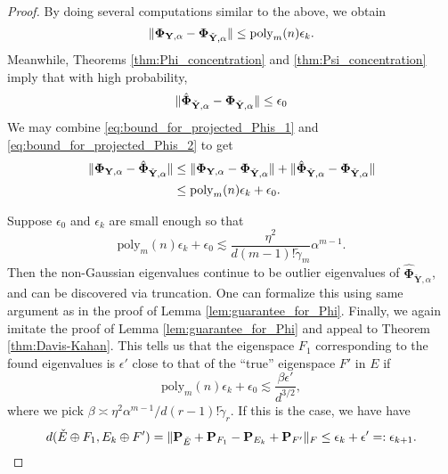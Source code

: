 \documentclass[final,12pt]{colt2018} %
\numberwithin{equation}{section}
\DeclarePairedDelimiter{\norm}{\lVert}{\rVert}
\newcommand{\boldPhi}{\boldsymbol{\Phi}}
\newcommand{\boldP}{\textbf{P}}
\newcommand{\boldY}{\textbf{Y}}
\begin{document}
\begin{proof}
	By doing several computations similar to the above, we obtain
	\begin{equation} \label{eq:bound_for_projected_Phis_1}
	\norm{\boldPhi_{\boldY,\alpha} - \boldPhi_{\check{\boldY},\alpha}} \leq \text{poly}_m(n)\epsilon_k.
	\end{equation}
	Meanwhile, Theorems \ref{thm:Phi_concentration} and \ref{thm:Psi_concentration} imply that with high probability,
	\begin{equation} \label{eq:bound_for_projected_Phis_2}
	\norm{\hat{\boldPhi}_{\check{\boldY},\alpha} - \boldPhi_{\check{\boldY},\alpha}} \leq \epsilon_0
	\end{equation}
	We may combine \eqref{eq:bound_for_projected_Phis_1} and \eqref{eq:bound_for_projected_Phis_2} to get
	\begin{align*}
	\norm{\boldPhi_{\boldY,\alpha} - \hat{\boldPhi}_{\check{\boldY},\alpha}} & \leq \norm{\boldPhi_{\boldY,\alpha} - \boldPhi_{\check{\boldY},\alpha}} + \norm{\hat{\boldPhi}_{\check{\boldY},\alpha} - \boldPhi_{\check{\boldY},\alpha}} \\
	& \leq \text{poly}_m(n)\epsilon_k+ \epsilon_0.
	\end{align*}
	
	Suppose $\epsilon_0$ and $\epsilon_k$ are small enough so that
	\begin{equation} \label{eq:first_req_for_eps}
	\text{poly}_m(n)\epsilon_k + \epsilon_0 \lesssim \frac{\eta^2}{d(m-1)!\tilde{\gamma}_m}\alpha^{m-1}.
	\end{equation}
	Then the non-Gaussian eigenvalues continue to be outlier eigenvalues of $\hat{\boldPhi}_{\check{\boldY},\alpha}$, and can be discovered via truncation. One can formalize this using same argument as in the proof of Lemma \ref{lem:guarantee_for_Phi}. Finally, we again imitate the proof of Lemma \ref{lem:guarantee_for_Phi} and appeal to Theorem \ref{thm:Davis-Kahan}. This tells us that the eigenspace $F_1$ corresponding to the found eigenvalues is $\epsilon'$ close to that of the ``true'' eigenspace $F'$ in $E$ if
	\begin{equation} \label{eq:second_req_for_eps}
	\text{poly}_m(n)\epsilon_k + \epsilon_0 \lesssim \frac{\beta\epsilon'}{d^{3/2}},
	\end{equation}
	where we pick $\beta \asymp \eta^2\alpha^{m-1}/d(r-1)!\tilde{\gamma}_r$. If this is the case, we have have
	\begin{equation*}
	d(\check{E}\oplus F_1,E_k\oplus F') = \norm{\boldP_{\check{E}}+\boldP_{F_1} - \boldP_{E_k}+\boldP_{F'}}_F \leq \epsilon_k + \epsilon' =: \epsilon_{k+1}.
	\end{equation*}
	

\end{proof}
\end{document}
